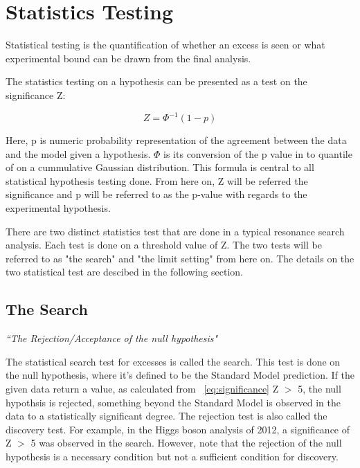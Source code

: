 \section{Statistics Testing}
\label{section:stats}
Statistical testing is the quantification of whether an excess is seen or what experimental bound can be drawn from the final analysis. 

The statistics testing on a hypothesis can be presented as a test on the significance Z: 

\begin{equation}
 Z= \Phi^{-1}(1-p) 
 \label{eq:significance}
\end{equation}

Here, p is numeric probability representation of the agreement between the data and the model given a hypothesis. $\Phi$ is its conversion of the p value in to quantile of on a cummulative Gaussian distribution. This formula is central to all statistical hypothesis testing done. From here on, Z will be referred the significance and p will be referred to as the p-value with regards to the experimental hypothesis. 

There are two distinct statistics test that are done in a typical resonance search analysis. Each test is done on a threshold value of Z. The two tests will be referred to as "the search" and "the limit setting" from here on. The details on the two statistical test are descibed in the following section.





\subsection{The Search}
\label{sec:thesearch}

\textit{``The Rejection/Acceptance of the null hypothesis"}

The statistical search test for excesses is called the search. This test is done on the null hypothesis, where it's defined to be the Standard Model prediction. If the given data return a value, as calculated from ~\ref{eq:significance} Z $>$ 5, the null hypothsis is rejected, something beyond the Standard Model is observed in the data to a statistically significant degree. The rejection test is also called the discovery test. For example, in the Higgs boson analysis of 2012, a significance of Z
$>$ 5 was observed in the search. However, note that the rejection of the null hypothesis is a necessary condition but not a sufficient condition for discovery.

